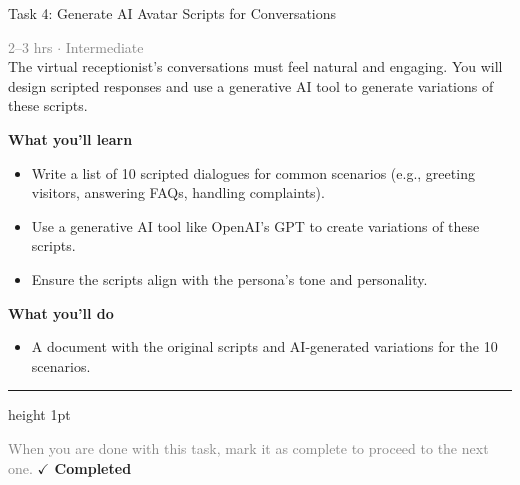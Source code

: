 \documentclass[10pt,a4paper]{article}
\begin{document}
\begin{taskbox}{Task 4: Generate AI Avatar Scripts for Conversations}

    {\small \textcolor{gray}{2--3 hrs $\cdot$ Intermediate}}\\[12pt]

      
The virtual receptionist’s conversations must feel natural and engaging. You will design scripted responses and use a generative AI tool to generate variations of these scripts.


\vspace{8pt}
{\large \textbf{\textcolor{brandLight}{What you'll learn}}}\\[4pt]  
\begin{itemize}
    \item Write a list of 10 scripted dialogues for common scenarios (e.g., greeting visitors, answering FAQs, handling complaints).  
    \item Use a generative AI tool like OpenAI’s GPT to create variations of these scripts.  
    \item Ensure the scripts align with the persona’s tone and personality.  
\end{itemize}

\vspace{8pt}
{\large \textbf{\textcolor{brandLight}{What you'll do}}}\\[4pt]  
\begin{itemize}
    \item A document with the original scripts and AI-generated variations for the 10 scenarios.\par
\end{itemize}

    \vspace{16pt}

    \textcolor{cardBorder}{\hrule height 1pt}\vspace{8pt}

    \small \textcolor{gray}{When you are done with this task, mark it as complete to proceed to the next one.} \hfill \textbf{\textcolor{brandDark}{$\checkmark$ Completed}}

\end{taskbox}
\end{document}
